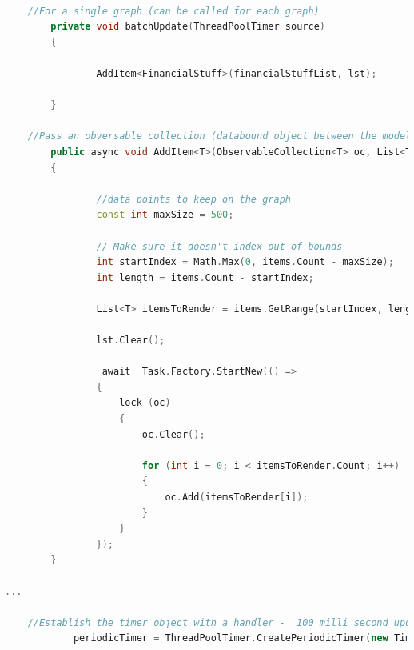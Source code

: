 \documentclass[]{article}
\begin{document}
\begin{lstlisting}[language=C++, caption=Batch update code (for generic types),label={lst:csharpeble}]

	//For a single graph (can be called for each graph)
        private void batchUpdate(ThreadPoolTimer source)
        {
            
                AddItem<FinancialStuff>(financialStuffList, lst);                        

        }

	//Pass an obversable collection (databound object between the model and the view), and a list of items to append to the collection
        public async void AddItem<T>(ObservableCollection<T> oc, List<T> items)
        {

                //data points to keep on the graph
                const int maxSize = 500;

                // Make sure it doesn't index out of bounds
                int startIndex = Math.Max(0, items.Count - maxSize);
                int length = items.Count - startIndex;

                List<T> itemsToRender = items.GetRange(startIndex, length);

                lst.Clear();

                 await  Task.Factory.StartNew(() =>                
                {
                    lock (oc)
                    {
                        oc.Clear();

                        for (int i = 0; i < itemsToRender.Count; i++)
                        {
                            oc.Add(itemsToRender[i]);
                        }
                    }
                });
        }

...

	//Establish the timer object with a handler -  100 milli second update
            periodicTimer = ThreadPoolTimer.CreatePeriodicTimer(new TimerElapsedHandler(batchUpdate);, new TimeSpan(0, 0, 0, 0, 100000));
\end{lstlisting}
\end{document}
